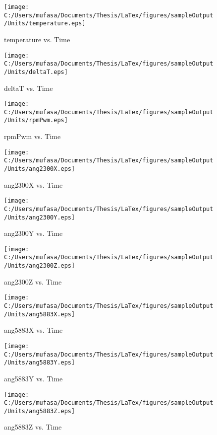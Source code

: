 \begin{figure}[]
	\centering
	\caption{temperature vs. Time}
		\texttt{[image: C:/Users/mufasa/Documents/Thesis/LaTex/figures/sampleOutput/Units/temperature.eps]}
\end{figure}
\begin{figure}[]
	\centering
	\caption{deltaT vs. Time}
		\texttt{[image: C:/Users/mufasa/Documents/Thesis/LaTex/figures/sampleOutput/Units/deltaT.eps]}
\end{figure}
\begin{figure}[]
	\centering
	\caption{rpmPwm vs. Time}
		\texttt{[image: C:/Users/mufasa/Documents/Thesis/LaTex/figures/sampleOutput/Units/rpmPwm.eps]}
\end{figure}
\begin{figure}[]
	\centering
	\caption{ang2300X vs. Time}
		\texttt{[image: C:/Users/mufasa/Documents/Thesis/LaTex/figures/sampleOutput/Units/ang2300X.eps]}
\end{figure}
\begin{figure}[]
	\centering
	\caption{ang2300Y vs. Time}
		\texttt{[image: C:/Users/mufasa/Documents/Thesis/LaTex/figures/sampleOutput/Units/ang2300Y.eps]}
\end{figure}
\begin{figure}[]
	\centering
	\caption{ang2300Z vs. Time}
		\texttt{[image: C:/Users/mufasa/Documents/Thesis/LaTex/figures/sampleOutput/Units/ang2300Z.eps]}
\end{figure}
\begin{figure}[]
	\centering
	\caption{ang5883X vs. Time}
		\texttt{[image: C:/Users/mufasa/Documents/Thesis/LaTex/figures/sampleOutput/Units/ang5883X.eps]}
\end{figure}
\begin{figure}[]
	\centering
	\caption{ang5883Y vs. Time}
		\texttt{[image: C:/Users/mufasa/Documents/Thesis/LaTex/figures/sampleOutput/Units/ang5883Y.eps]}
\end{figure}
\begin{figure}[]
	\centering
	\caption{ang5883Z vs. Time}
		\texttt{[image: C:/Users/mufasa/Documents/Thesis/LaTex/figures/sampleOutput/Units/ang5883Z.eps]}
\end{figure}
